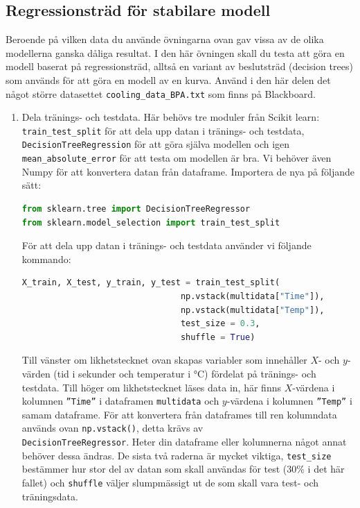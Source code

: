\documentclass{article}
\begin{document}
\subsection{Regressionsträd för stabilare modell}
Beroende på vilken data du använde övningarna ovan gav vissa av de olika modellerna ganska dåliga resultat. I den här övningen skall du testa att göra en modell baserat på regressionsträd, alltså en variant av beslutsträd (decision trees) som används för att göra en modell av en kurva. Använd i den här delen det något större datasettet \texttt{cooling\_data\_BPA.txt} som finns på Blackboard.
\begin{enumerate}
    \item Dela tränings- och testdata. Här behövs tre moduler från Scikit learn: \texttt{train\_test\_split} för att dela upp datan i tränings- och testdata,\\ \texttt{DecisionTreeRegression} för att göra själva modellen och igen\\ \texttt{mean\_absolute\_error} för att testa om modellen är bra. Vi behöver även Numpy för att konvertera datan från dataframe. Importera de nya på följande sätt:
    \begin{lstlisting}[language=Python]
from sklearn.tree import DecisionTreeRegressor
from sklearn.model_selection import train_test_split
\end{lstlisting}
    För att dela upp datan i tränings- och testdata använder vi följande kommando:
    \begin{lstlisting}[language=Python]
X_train, X_test, y_train, y_test = train_test_split(
                                np.vstack(multidata["Time"]), 
                                np.vstack(multidata["Temp"]), 
                                test_size = 0.3, 
                                shuffle = True)    
\end{lstlisting}
    Till vänster om likhetstecknet ovan skapas variabler som innehåller $X$- och $y$-värden (tid i sekunder och temperatur i \si{\celsius}) fördelat på tränings- och testdata. Till höger om likhetstecknet läses data in, här finns $X$-värdena i kolumnen \texttt{”Time”} i dataframen \texttt{multidata} och $y$-värdena i kolumnen \texttt{”Temp”} i samam dataframe. För att konvertera från dataframes till ren kolumndata används ovan \texttt{np.vstack()}, detta krävs av\\ \texttt{DecisionTreeRegressor}. Heter din dataframe eller kolumnerna något annat behöver dessa ändras. De sista två raderna är mycket viktiga, \texttt{test\_size} bestämmer hur stor del av datan som skall användas för test (30\% i det här fallet) och \texttt{shuffle} väljer slumpmässigt ut de som skall vara test- och träningsdata.

\end{enumerate}
\end{document}
